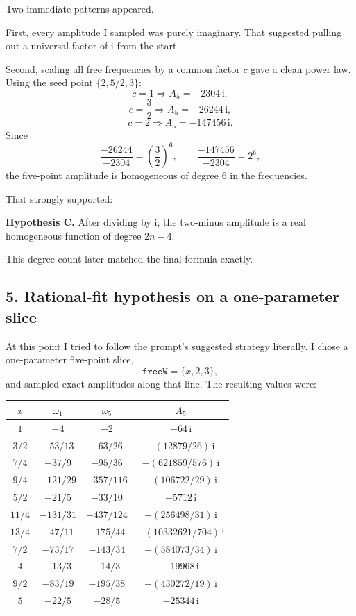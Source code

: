 \documentclass[11pt]{article}
\newcommand{\ii}{\mathrm{i}}
\begin{document}
Two immediate patterns appeared.

First, every amplitude I sampled was purely imaginary. That suggested pulling
out a universal factor of $\ii$ from the start.

Second, scaling all free frequencies by a common factor $c$ gave a clean power
law. Using the seed point $\{2,5/2,3\}$:
\[
c=1 \Longrightarrow A_5=-2304\,\ii,
\]
\[
c=\frac32 \Longrightarrow A_5=-26244\,\ii,
\]
\[
c=2 \Longrightarrow A_5=-147456\,\ii.
\]
Since
\[
\frac{-26244}{-2304}=\left(\frac32\right)^6,
\qquad
\frac{-147456}{-2304}=2^6,
\]
the five-point amplitude is homogeneous of degree $6$ in the frequencies.

That strongly supported:

\medskip
\textbf{Hypothesis C.} After dividing by $\ii$, the two-minus amplitude is a
real homogeneous function of degree $2n-4$.
\medskip

This degree count later matched the final formula exactly.

\subsection*{5. Rational-fit hypothesis on a one-parameter slice}

At this point I tried to follow the prompt's suggested strategy literally. I
chose a one-parameter five-point slice,
\[
\texttt{freeW}=\{x,2,3\},
\]
and sampled exact amplitudes along that line. The resulting values were:

\begin{center}
\small
\begin{tabular}{cccc}
\toprule
$x$ & $\omega_1$ & $\omega_5$ & $A_5$ \\
\midrule
$1$ & $-4$ & $-2$ & $-64\,\ii$ \\
$3/2$ & $-53/13$ & $-63/26$ & $-(12879/26)\,\ii$ \\
$7/4$ & $-37/9$ & $-95/36$ & $-(621859/576)\,\ii$ \\
$9/4$ & $-121/29$ & $-357/116$ & $-(106722/29)\,\ii$ \\
$5/2$ & $-21/5$ & $-33/10$ & $-5712\,\ii$ \\
$11/4$ & $-131/31$ & $-437/124$ & $-(256498/31)\,\ii$ \\
$13/4$ & $-47/11$ & $-175/44$ & $-(10332621/704)\,\ii$ \\
$7/2$ & $-73/17$ & $-143/34$ & $-(584073/34)\,\ii$ \\
$4$ & $-13/3$ & $-14/3$ & $-19968\,\ii$ \\
$9/2$ & $-83/19$ & $-195/38$ & $-(430272/19)\,\ii$ \\
$5$ & $-22/5$ & $-28/5$ & $-25344\,\ii$ \\
\bottomrule
\end{tabular}
\end{center}
\end{document}
